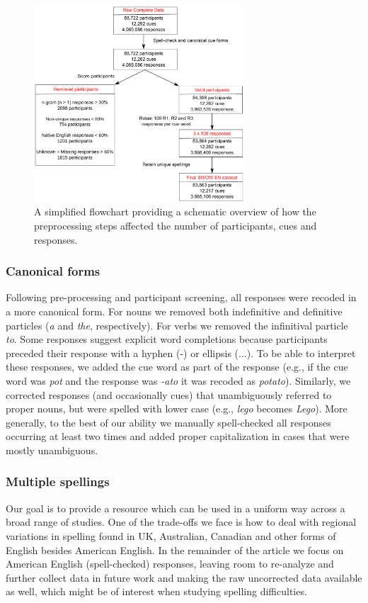 \documentclass[a4paper,doc,natbib,floatsintext]{apa6}
\newcommand{\stim}[1]{\textsl{#1}}
\begin{document}
\begin{figure}[t]
\centering
\includegraphics[width=0.7\textwidth]{figures/flowChartPreprocessing.pdf}
\caption{\small{A simplified flowchart providing a schematic overview of how the preprocessing steps affected the number of participants, cues and responses.}}
\vspace{0.1cm}
\label{figure:flowchart}
\end{figure}


\subsubsection{Canonical forms}
Following pre-processing and participant screening, all responses were recoded in a more canonical form. For nouns we removed both indefinitive and definitive particles (\stim{a} and \stim{the}, respectively). For verbs we removed the infinitival particle \stim{to}. Some responses suggest explicit word completions because participants preceded their response with a hyphen (-) or ellipsis (...).
To be able to interpret these responses, we added the cue word as part of the response (e.g., if the cue word was \stim{pot} and the response was \stim{-ato} it was recoded as \stim{potato}). Similarly, we corrected responses (and occasionally cues) that unambiguously referred to proper nouns, but were spelled with lower case (e.g., \stim{lego} becomes \stim{Lego}). More generally, to the best of our ability we manually spell-checked all responses occurring at least two times and added proper capitalization in cases that were mostly unambiguous.

\subsubsection{Multiple spellings}
Our goal is to provide a resource which can be used in a uniform way across a broad range of studies. One of the trade-offs we face is how to deal with regional variations in spelling found in UK, Australian, Canadian and other forms of English besides American English. In the remainder of the article we focus on American English (spell-checked) responses, leaving room to re-analyze and further collect data in future work and making the raw uncorrected data available as well, which might be of interest when studying spelling difficulties.
\end{document}
